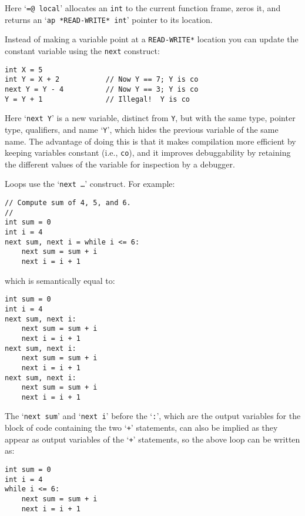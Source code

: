 \documentclass[12pt]{article}
\newenvironment{indpar}[1][0.3in]%
	{\begin{list}{}%
		     {\setlength{\itemsep}{0in}%
		      \setlength{\topsep}{0in}%
		      \setlength{\parsep}{1ex}%
		      \setlength{\labelwidth}{#1}%
		      \setlength{\leftmargin}{#1}%
		      \addtolength{\leftmargin}{\labelsep}}%
	 \item}%
	{\end{list}}
\begin{document}
Here `{\tt =@ local}' allocates an {\tt int} to the current
function frame, zeros it, and returns an `{\tt ap *READ-WRITE* int}'
pointer to its location.

Instead of making a variable point at a {\tt *READ-WRITE*} location you
can update the constant variable using the {\tt next} construct:
\begin{indpar}\begin{verbatim}
int X = 5
int Y = X + 2           // Now Y == 7; Y is co
next Y = Y - 4          // Now Y == 3; Y is co
Y = Y + 1               // Illegal!  Y is co
\end{verbatim}\end{indpar}
Here `{\tt next Y}' is a new variable, distinct from {\tt Y},
but with the same type, pointer type, qualifiers, and name `{\tt Y}',
which hides the previous variable of the same name.
The advantage of doing this is that it makes compilation more
efficient by keeping variables constant (i.e., {\tt co}), and
it improves debuggability by retaining the different values of
the variable for inspection by a debugger.

Loops use the `{\tt next \ldots}' construct.  For example:
\begin{indpar}\begin{verbatim}
// Compute sum of 4, 5, and 6.
//
int sum = 0
int i = 4
next sum, next i = while i <= 6:
    next sum = sum + i
    next i = i + 1
\end{verbatim}\end{indpar}
which is semantically equal to:
\begin{indpar}\begin{verbatim}
int sum = 0
int i = 4
next sum, next i:
    next sum = sum + i
    next i = i + 1
next sum, next i:
    next sum = sum + i
    next i = i + 1
next sum, next i:
    next sum = sum + i
    next i = i + 1
\end{verbatim}\end{indpar}
The `{\tt next sum}' and `{\tt next i}' before the `{\tt :}',
which are the output variables for the block of code containing
the two `{\tt +}' statements,
can also be implied as they appear as output variables
of the `{\tt +}' statements, so the above loop can be written as:
\begin{indpar}\begin{verbatim}
int sum = 0
int i = 4
while i <= 6:
    next sum = sum + i
    next i = i + 1
\end{verbatim}\end{indpar}
\end{document}
